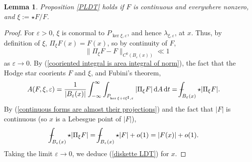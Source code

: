 \documentclass[reqno,11pt]{amsart}
\newcommand*\dif{\mathop{}\!\mathrm{d}}
\newtheorem{lemma}[theorem]{Lemma}
\theoremstyle{definition}
\numberwithin{equation}{section}
\def\Xint#1{\mathchoice
{\XXint\displaystyle\textstyle{#1}}%
{\XXint\textstyle\scriptstyle{#1}}%
{\XXint\scriptstyle\scriptscriptstyle{#1}}%
{\XXint\scriptscriptstyle\scriptscriptstyle{#1}}%
\!\int}
\def\XXint#1#2#3{{\setbox0=\hbox{$#1{#2#3}{\int}$ }
\vcenter{\hbox{$#2#3$ }}\kern-.6\wd0}}
\def\dashint{\Xint-}
\begin{document}
\begin{lemma}\label{PLDT continuous}
Proposition \ref{PLDT} holds if $F$ is continuous and everywhere nonzero, and $\xi := \star F/F$.
\end{lemma}
\begin{proof}
For $\varepsilon > 0$, $\xi$ is conormal to $P_{\ker \xi, \varepsilon}$, and hence $\lambda_{\xi, \varepsilon}$, at $x$.
Thus, by definition of $\xi$, $\Pi_\xi F(x) = F(x)$, so by continuity of $F$,
\begin{equation}\label{continuous forms are almost their projections}
	\|\Pi_\xi F - F\|_{C^0(B_\varepsilon(x))} \ll 1
\end{equation}
as $\varepsilon \to 0$.
By (\ref{cooriented integral is area integral of norm}), the fact that the Hodge star coorients $F$ and $\xi$, and Fubini's theorem,
\begin{align*}
A(F, \xi, \varepsilon)
&= \frac{1}{|B_\varepsilon(x)|} \int_{-\infty}^\infty \int_{P_{\ker \xi + t\xi^\sharp, \varepsilon}} |\Pi_\xi F| \dif A \dif t
= \dashint_{B_\varepsilon(x)} \star |\Pi_\xi F|.
\end{align*}
By (\ref{continuous forms are almost their projections}) and the fact that $|F|$ is continuous (so $x$ is a Lebesgue point of $|F|$),
\begin{align*}
\dashint_{B_\varepsilon(x)} \star |\Pi_\xi F|
&= \dashint_{B_\varepsilon(x)} \star |F| + o(1) = |F(x)| + o(1).
\end{align*}
Taking the limit $\varepsilon \to 0$, we deduce (\ref{diskette LDT}) for $x$.
\end{proof}
\end{document}
